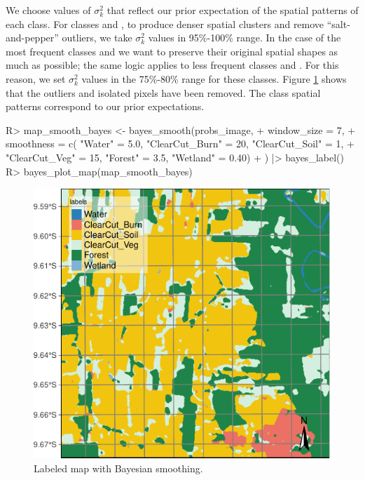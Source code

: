 \documentclass[
  shortnames]{jss}
\begin{document}
We choose values of \(\sigma^2_{k}\) that reflect our prior expectation of the spatial patterns of each class. For classes  and , to produce denser spatial clusters and remove ``salt-and-pepper'' outliers, we take \(\sigma^2_{k}\) values in 95\%-100\% range. In the case of the most frequent classes  and  we want to preserve their original spatial shapes as much as possible; the same logic applies to less frequent classes  and . For this reason, we set \(\sigma^2_{k}\) values in the 75\%-80\% range for these classes. Figure \ref{fig:smth1} shows that the outliers and isolated pixels have been removed. The class spatial patterns correspond to our prior expectations.

\begin{CodeChunk}
\begin{CodeInput}
R> map_smooth_bayes <- bayes_smooth(probs_image,
+     window_size = 7,
+     smoothness = c( "Water" = 5.0, "ClearCut_Burn" = 20, "ClearCut_Soil" = 1, 
+       "ClearCut_Veg" =  15, "Forest" = 3.5, "Wetland" = 0.40)
+     ) |> bayes_label()
R> bayes_plot_map(map_smooth_bayes)
\end{CodeInput}
\begin{figure}[h]

{\centering \includegraphics{Bayesian_smoothing_JSS_files/figure-latex/smth1-1} 

}

\caption[Labeled map with Bayesian  smoothing]{Labeled map with Bayesian  smoothing.}\label{fig:smth1}
\end{figure}
\end{CodeChunk}
\end{document}
